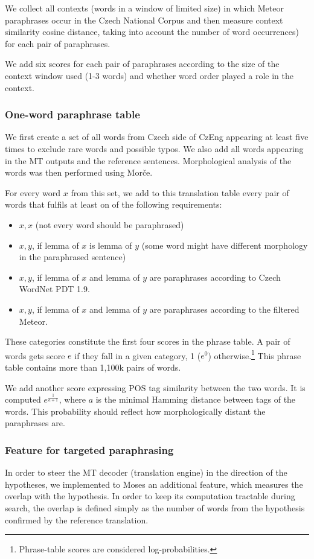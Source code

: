 \documentclass[11pt]{article}
\begin{document}
We collect all contexts (words in a window of limited size) in which Meteor 
paraphrases occur in the Czech National Corpus \cite{SYN2010} and then measure 
context similarity cosine distance, taking into account the number of word 
occurrences) for each pair of paraphrases. 

We add six scores for each pair of paraphrases according to the size of the 
context window used (1-3 words) and whether word order played a role in the 
context. 

\subsubsection*{One-word paraphrase table}
We first create a set of all words from Czech side of CzEng appearing at 
least five times to exclude rare words and possible typos. We also add all 
words appearing in the MT outputs and the reference sentences. Morphological 
analysis of the words was then performed using Morče. 

For every word $ x $ from this set, we add to this translation table every pair 
of words that fulfils at least on of the following requirements:

\begin{itemize}
\item $ x,x $ (not every word should be paraphrased)
\item $ x,y $, if lemma of $ x $ is lemma of $ y $ (some word 
might have different morphology in the paraphrased sentence)
\item $ x,y $, if lemma of $ x $ and lemma of $ y $ are paraphrases according 
to Czech WordNet PDT 1.9.
\item $ x,y $, if lemma of $ x $ and lemma of $ y $ are paraphrases according 
to the filtered Meteor.
\end{itemize}

These categories constitute the first four scores in the phrase table. A pair 
of words gets score $ e $ if they fall in a given category, 1 ($e^0$) 
otherwise.\footnote{Phrase-table scores are considered log-probabilities.} 
This phrase table contains more than 1,100k pairs of words.

We add another score expressing POS tag similarity between the two words. It is 
computed $ e^{\frac{1}{a+1}}$, where $ a $ is the minimal Hamming distance 
between tags of the words. This probability should reflect how morphologically 
distant the paraphrases are. 

\subsubsection{Feature for targeted paraphrasing}
In order to steer the MT decoder (translation engine) in the direction of the 
hypotheses, we implemented to Moses an additional feature, which measures the 
overlap with the hypothesis. In order to keep its computation tractable during 
search, the overlap is defined simply as the number of words from the 
hypothesis confirmed by the reference translation.
\end{document}
